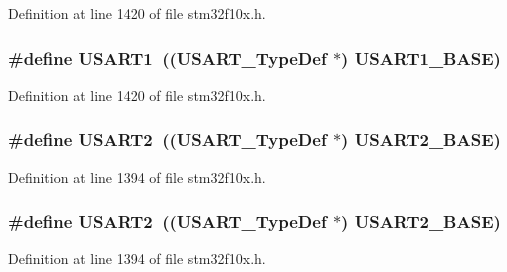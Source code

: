 Definition at line 1420 of file stm32f10x.\+h.

\subsubsection[{\texorpdfstring{U\+S\+A\+R\+T1}{USART1}}]{\setlength{\rightskip}{0pt plus 5cm}\#define U\+S\+A\+R\+T1~(({\bf U\+S\+A\+R\+T\+\_\+\+Type\+Def} $\ast$) {\bf U\+S\+A\+R\+T1\+\_\+\+B\+A\+SE})}\hypertarget{group___peripheral__declaration_ga92871691058ff7ccffd7635930cb08da}{}\label{group___peripheral__declaration_ga92871691058ff7ccffd7635930cb08da}


Definition at line 1420 of file stm32f10x.\+h.

\subsubsection[{\texorpdfstring{U\+S\+A\+R\+T2}{USART2}}]{\setlength{\rightskip}{0pt plus 5cm}\#define U\+S\+A\+R\+T2~(({\bf U\+S\+A\+R\+T\+\_\+\+Type\+Def} $\ast$) {\bf U\+S\+A\+R\+T2\+\_\+\+B\+A\+SE})}\hypertarget{group___peripheral__declaration_gaf114a9eab03ca08a6fb720e511595930}{}\label{group___peripheral__declaration_gaf114a9eab03ca08a6fb720e511595930}


Definition at line 1394 of file stm32f10x.\+h.

\subsubsection[{\texorpdfstring{U\+S\+A\+R\+T2}{USART2}}]{\setlength{\rightskip}{0pt plus 5cm}\#define U\+S\+A\+R\+T2~(({\bf U\+S\+A\+R\+T\+\_\+\+Type\+Def} $\ast$) {\bf U\+S\+A\+R\+T2\+\_\+\+B\+A\+SE})}\hypertarget{group___peripheral__declaration_gaf114a9eab03ca08a6fb720e511595930}{}\label{group___peripheral__declaration_gaf114a9eab03ca08a6fb720e511595930}


Definition at line 1394 of file stm32f10x.\+h.

